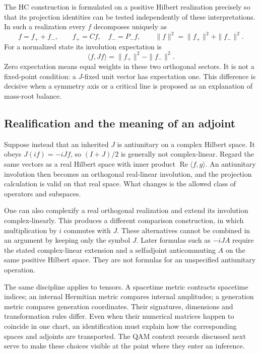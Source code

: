 \documentclass[11pt,a4paper]{article}
\begin{document}
The HC construction is formulated on a positive Hilbert realization
precisely so that its projection identities can be tested independently
of these interpretations. In such a realization every $f$ decomposes
uniquely as
\begin{equation}
 f=f_++f_-,\qquad f_+=Cf,\quad f_-=P_-f,\qquad
 \|f\|^2=\|f_+\|^2+\|f_-\|^2.
\end{equation}
For a normalized state its involution expectation is
\begin{equation}
 \langle f,Jf\rangle=\|f_+\|^2-\|f_-\|^2.
\end{equation}
Zero expectation means equal weights in these two orthogonal sectors.
It is not a fixed-point condition: a $J$-fixed unit vector has expectation
one. This difference is decisive when a symmetry axis or a critical
line is proposed as an explanation of mass-root balance.

\subsection{Realification and the meaning of an adjoint}
Suppose instead that an inherited $J$ is antiunitary on a complex
Hilbert space. It obeys $J(if)=-iJf$, so $(I+J)/2$ is generally not
complex-linear. Regard the same vectors as a real Hilbert space with
inner product $\operatorname{Re}\langle f,g\rangle$. An antiunitary
involution then becomes an orthogonal real-linear involution, and the
projection calculation is valid on that real space. What changes is
the allowed class of operators and subspaces.

One can also complexify a real orthogonal realization and extend its
involution complex-linearly. This produces a different comparison
construction, in which multiplication by $i$ commutes with $J$.
These alternatives cannot be combined in an argument by keeping only
the symbol $J$. Later formulas such as $-iJA$ require the stated
complex-linear extension and a selfadjoint anticommuting $A$ on the
same positive Hilbert space. They are not formulas for an unspecified
antiunitary operation.

The same discipline applies to tensors. A spacetime metric contracts
spacetime indices; an internal Hermitian metric compares internal
amplitudes; a generation metric compares generation coordinates.
Their signatures, dimensions and transformation rules differ. Even
when their numerical matrices happen to coincide in one chart, an
identification must explain how the corresponding spaces and adjoints
are transported. The QAM context records discussed next serve to make
these choices visible at the point where they enter an inference.
\end{document}
